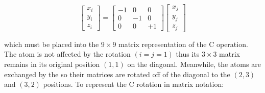 \begin{equation*}
    \begin{bmatrix}
        x_i \\ y_i \\ z_i
    \end{bmatrix} = \begin{bmatrix}
        -1 & 0 & 0 \\
        0 & -1 & 0 \\
        0 & 0 & +1
    \end{bmatrix} \begin{bmatrix}
        x_j \\ y_j \\ z_j
    \end{bmatrix}
\end{equation*}

\noindent which must be placed into the $9\times9$ matrix representation of the \symop[2]C operation.
The  atom is not affected by the rotation $(i = j = 1)$ thus its $3\times3$ matrix remains in its original position $(1, 1)$ on the diagonal.
Meanwhile, the  atoms are exchanged by the  so their matrices are rotated off of the diagonal to the $(2, 3)$ and $(3, 2)$ positions.
To represent the \symop[2]C rotation in matrix notation:

